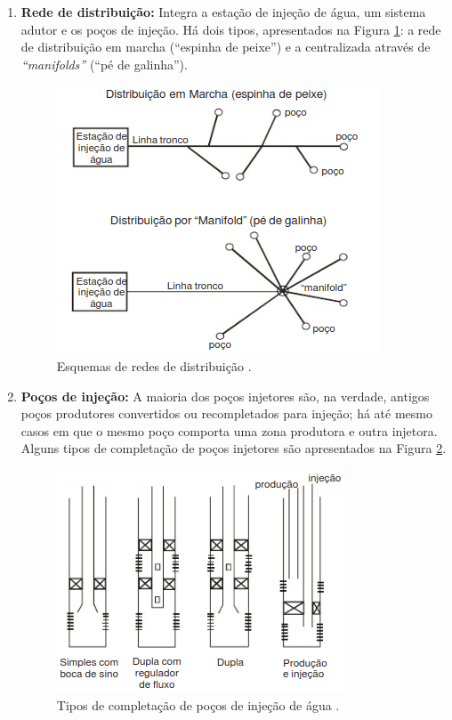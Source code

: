\begin{enumerate}
\item \textbf{Rede de distribui\c{c}\~{a}o:} Integra a esta\c{c}\~{a}o de inje\c{c}\~{a}o de \'{a}gua, um sistema adutor e os po\c{c}os de inje\c{c}\~{a}o. H\'{a} dois tipos, apresentados na Figura \ref{fig:rev_redis}: a rede de distribui\c{c}\~{a}o em marcha (``espinha de peixe'') e a centralizada atrav\'{e}s de \textit{``manifolds''} (``p\'{e} de galinha'').

\begin{figure}[!ht]
\centering
\includegraphics[width=.6\textwidth]{figs/revisao/revisao_redis.png}
\caption{Esquemas de redes de distribui\c{c}\~{a}o \cite[p. 657]{engres}.}\label{fig:rev_redis}
\end{figure}

\item \textbf{Po\c{c}os de inje\c{c}\~{a}o:} A maioria dos po\c{c}os injetores s\~{a}o, na verdade, antigos po\c{c}os produtores convertidos ou recompletados para inje\c{c}\~{a}o; h\'{a} at\'{e} mesmo casos em que o mesmo po\c{c}o comporta uma zona produtora e outra injetora. Alguns tipos de completa\c{c}\~{a}o de po\c{c}os injetores s\~{a}o apresentados na Figura \ref{fig:rev_incmp}. 

\begin{figure}[!ht]
\centering
\includegraphics[width=.6\textwidth]{figs/revisao/revisao_injcomp.png}
\caption{Tipos de completa\c{c}\~{a}o de po\c{c}os de inje\c{c}\~{a}o de \'{a}gua \cite[p. 658]{engres}.}\label{fig:rev_incmp}
\end{figure}


\end{enumerate}
